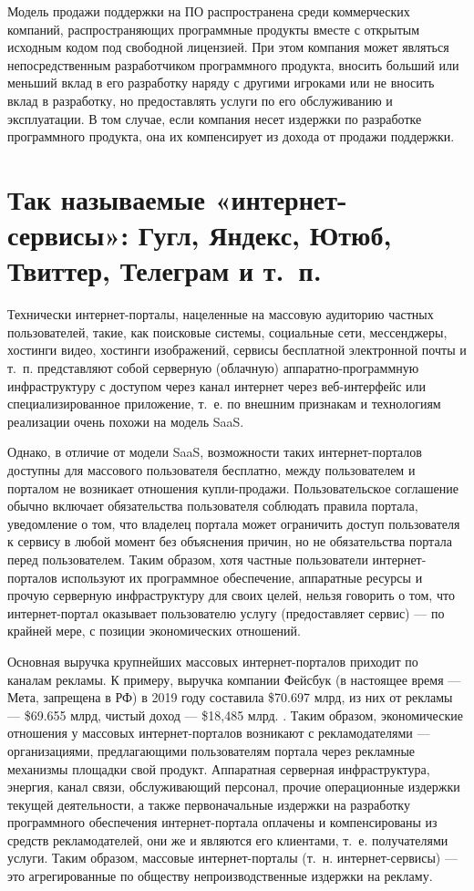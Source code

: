 \documentclass{article}
\begin{document}
Модель продажи поддержки на ПО распространена среди коммерческих компаний, распространяющих программные продукты вместе с открытым исходным кодом под свободной лицензией. При этом компания может являться непосредственным разработчиком программного продукта, вносить больший или меньший вклад в его разработку наряду с другими игроками или не вносить вклад в разработку, но предоставлять услуги по его обслуживанию и эксплуатации. В том случае, если компания несет издержки по разработке программного продукта, она их компенсирует из дохода от продажи поддержки.

\section*{Так называемые «интернет-сервисы»: Гугл, Яндекс, Ютюб, Твиттер, Телеграм и т.~п.}

Технически интернет-порталы, нацеленные на массовую аудиторию частных пользователей, такие, как поисковые системы, социальные сети, мессенджеры, хостинги видео, хостинги изображений, сервисы бесплатной электронной почты и т.~п. представляют собой серверную (облачную) аппаратно-программную инфраструктуру с доступом через канал интернет через веб-интерфейс или специализированное приложение, т.~е. по внешним признакам и технологиям реализации очень похожи на модель SaaS.

Однако, в отличие от модели SaaS, возможности таких интернет-порталов доступны для массового пользователя бесплатно, между пользователем и порталом не возникает отношения купли-продажи. Пользовательское соглашение обычно включает обязательства пользователя соблюдать правила портала, уведомление о том, что владелец портала может ограничить доступ пользователя к сервису в любой момент без объяснения причин, но не обязательства портала перед пользователем. Таким образом, хотя частные пользователи интернет-порталов используют их программное обеспечение, аппаратные ресурсы и прочую серверную инфраструктуру для своих целей, нельзя говорить о том, что интернет-портал оказывает пользователю услугу (предоставляет сервис) — по крайней мере, с позиции экономических отношений.

Основная выручка крупнейших массовых интернет-порталов приходит по каналам рекламы. К примеру, выручка компании Фейсбук (в настоящее время — Мета, запрещена в РФ) в 2019 году составила \$70.697 млрд, из них от рекламы — \$69.655 млрд, чистый доход — \$18,485 млрд. \cite{facebook10K2019}. Таким образом, экономические отношения у массовых интернет-порталов возникают с рекламодателями — организациями, предлагающими пользователям портала через рекламные механизмы площадки свой продукт. Аппаратная серверная инфраструктура, энергия, канал связи, обслуживающий персонал, прочие операционные издержки текущей деятельности, а также первоначальные издержки на разработку программного обеспечения интернет-портала оплачены и компенсированы из средств рекламодателей, они же и являются его клиентами, т.~е. получателями услуги. Таким образом, массовые интернет-порталы (т.~н. интернет-сервисы) — это агрегированные по обществу непроизводственные издержки на рекламу.
\end{document}
